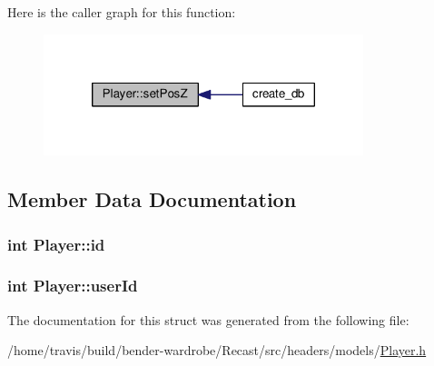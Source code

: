 Here is the caller graph for this function\-:
\nopagebreak
\begin{figure}[H]
\begin{center}
\leavevmode
\includegraphics[width=264pt]{struct_player_a265ea0b3d9627fb6f9e65dfb3aed66f7_icgraph}
\end{center}
\end{figure}




\subsection{Member Data Documentation}
\hypertarget{struct_player_a05e05f3a23de78da7ec032ec2bcf8c6c}{
\subsubsection[{id}]{\setlength{\rightskip}{0pt plus 5cm}int Player\-::id}}\label{struct_player_a05e05f3a23de78da7ec032ec2bcf8c6c}
\hypertarget{struct_player_a5c801c5fa6666baddd65a2863cc6e7f2}{
\subsubsection[{user\-Id}]{\setlength{\rightskip}{0pt plus 5cm}int Player\-::user\-Id}}\label{struct_player_a5c801c5fa6666baddd65a2863cc6e7f2}


The documentation for this struct was generated from the following file\-:\begin{DoxyCompactItemize}
\item 
/home/travis/build/bender-\/wardrobe/\-Recast/src/headers/models/\hyperlink{_player_8h}{Player.\-h}\end{DoxyCompactItemize}
